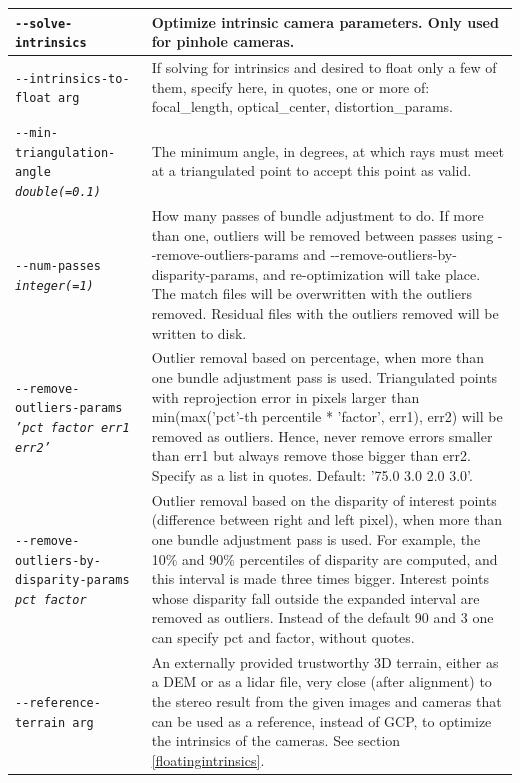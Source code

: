 \begin{longtable}{|p{8cm}|p{9cm}|}
\texttt{-\/-solve-intrinsics} & Optimize intrinsic camera parameters. Only used for pinhole cameras.\\ \hline

\texttt{-\/-intrinsics-to-float arg} & If solving for intrinsics and desired to float only a few of them, specify here, in quotes, one or more of: focal\_length, optical\_center, distortion\_params.\\ \hline

\texttt{-\/-min-triangulation-angle \textit{double(=0.1)}} &
The minimum angle, in degrees, at which rays must meet at a triangulated point to accept this point as valid.
\\ \hline

\texttt{-\/-num-passes \textit{integer(=1)}} &
How many passes of bundle adjustment to do. If more than one, outliers will be removed between passes using -\/-remove-outliers-params and -\/-remove-outliers-by-disparity-params, and re-optimization will take place. The match files will be overwritten with the outliers removed. Residual files with the outliers removed will be written to disk.
\\ \hline

\texttt{-\/-remove-outliers-params \textit{'pct factor err1 err2'}} &
Outlier removal based on percentage, when more than one bundle adjustment pass is used. Triangulated points with reprojection error in pixels larger than min(max('pct'-th percentile * 'factor', err1), err2) will be removed as outliers. Hence, never remove errors smaller than err1 but always remove those bigger than err2. Specify as a list in quotes. Default: '75.0 3.0 2.0 3.0'.\\ \hline

\texttt{-\/-remove-outliers-by-disparity-params \textit{pct factor}} &
Outlier removal based on the disparity of interest points (difference between right and left pixel), when more than one bundle adjustment pass is used. For example, the 10\% and 90\% percentiles of disparity are computed, and this interval is made three times bigger. Interest points whose disparity fall outside the expanded interval are removed as outliers. Instead of the default 90 and 3 one can specify pct and factor, without quotes.\\ \hline

\texttt{-\/-reference-terrain arg} & An externally provided trustworthy 3D terrain, either as a DEM or as a lidar file, very close (after alignment) to the stereo result from the given images and cameras that can be used as a reference, instead of GCP, to optimize the intrinsics of the cameras. See section \ref{floatingintrinsics}. \\ \hline


\end{longtable}
